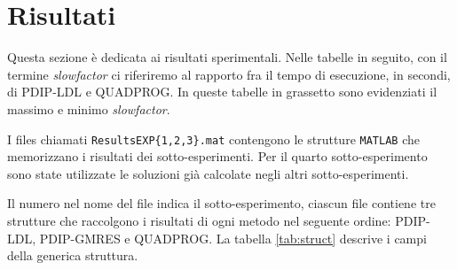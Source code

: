 \section{Risultati}
Questa sezione è dedicata ai risultati sperimentali.
Nelle tabelle in seguito, con il termine \textit{slowfactor} ci riferiremo al rapporto fra il tempo di esecuzione, in secondi, di PDIP-LDL e QUADPROG.
In queste tabelle in grassetto sono evidenziati il massimo e minimo \textit{slowfactor}.


I files chiamati \texttt{ResultsEXP\{1,2,3\}.mat} contengono le strutture \texttt{MATLAB} che memorizzano i risultati dei sotto-esperimenti. Per il quarto sotto-esperimento sono state utilizzate le soluzioni già calcolate negli altri sotto-esperimenti.

Il numero nel nome del file indica il sotto-esperimento, ciascun file contiene tre strutture che raccolgono i risultati di ogni metodo nel seguente ordine: PDIP-LDL, PDIP-GMRES e QUADPROG.
La tabella \ref{tab:struct} descrive i campi della generica struttura.


